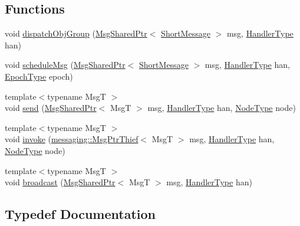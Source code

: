 \subsection*{Functions}
\begin{DoxyCompactItemize}
\item 
void \hyperlink{namespacevt_1_1objgroup_a8eab3eb6e73bbc92bce100e13a01a795}{dispatch\+Obj\+Group} (\hyperlink{namespacevt_ab2b3d506ec8e8d1540aede826d84a239}{Msg\+Shared\+Ptr}$<$ \hyperlink{namespacevt_a1125ac1da6c0bbf141e0ea0739d7602d}{Short\+Message} $>$ msg, \hyperlink{namespacevt_af64846b57dfcaf104da3ef6967917573}{Handler\+Type} han)
\item 
void \hyperlink{namespacevt_1_1objgroup_ab154142df9cf5401462e1b4cabb3b480}{schedule\+Msg} (\hyperlink{namespacevt_ab2b3d506ec8e8d1540aede826d84a239}{Msg\+Shared\+Ptr}$<$ \hyperlink{namespacevt_a1125ac1da6c0bbf141e0ea0739d7602d}{Short\+Message} $>$ msg, \hyperlink{namespacevt_af64846b57dfcaf104da3ef6967917573}{Handler\+Type} han, \hyperlink{namespacevt_a985a5adf291c34a3ca263b3378388236}{Epoch\+Type} epoch)
\item 
{\footnotesize template$<$typename MsgT $>$ }\\void \hyperlink{namespacevt_1_1objgroup_aa2e134493c6b8a23d7d5e86bd9df1a70}{send} (\hyperlink{namespacevt_ab2b3d506ec8e8d1540aede826d84a239}{Msg\+Shared\+Ptr}$<$ MsgT $>$ msg, \hyperlink{namespacevt_af64846b57dfcaf104da3ef6967917573}{Handler\+Type} han, \hyperlink{namespacevt_a866da9d0efc19c0a1ce79e9e492f47e2}{Node\+Type} node)
\item 
{\footnotesize template$<$typename MsgT $>$ }\\void \hyperlink{namespacevt_1_1objgroup_aee19dffbee9f43f1a28d08f1c07996c7}{invoke} (\hyperlink{structvt_1_1messaging_1_1_msg_ptr_thief}{messaging\+::\+Msg\+Ptr\+Thief}$<$ MsgT $>$ msg, \hyperlink{namespacevt_af64846b57dfcaf104da3ef6967917573}{Handler\+Type} han, \hyperlink{namespacevt_a866da9d0efc19c0a1ce79e9e492f47e2}{Node\+Type} node)
\item 
{\footnotesize template$<$typename MsgT $>$ }\\void \hyperlink{namespacevt_1_1objgroup_a1e6ef433bb1132944aba030b2a48d12d}{broadcast} (\hyperlink{namespacevt_ab2b3d506ec8e8d1540aede826d84a239}{Msg\+Shared\+Ptr}$<$ MsgT $>$ msg, \hyperlink{namespacevt_af64846b57dfcaf104da3ef6967917573}{Handler\+Type} han)
\end{DoxyCompactItemize}


\subsection{Typedef Documentation}
\mbox{\label{namespacevt_1_1objgroup_a25bec5d3c8e8bb02b62280eec62b8ac7}} 
